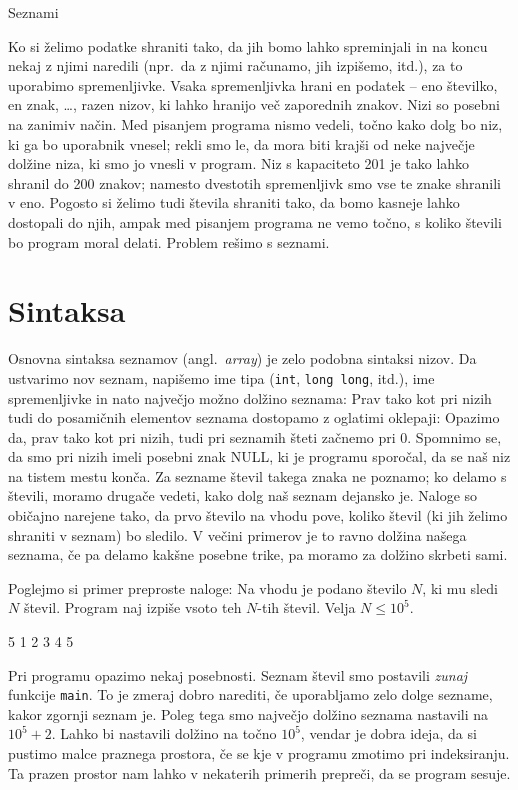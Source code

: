 
Seznami


Ko si želimo podatke shraniti tako, da jih bomo lahko spreminjali in na koncu
nekaj z njimi naredili (npr.~da z njimi računamo, jih izpišemo, itd.), za to
uporabimo spremenljivke.
Vsaka spremenljivka hrani en podatek -- eno številko, en znak, \ldots, razen
nizov, ki lahko hranijo več zaporednih znakov.
Nizi so posebni na zanimiv način.
Med pisanjem programa nismo vedeli, točno kako dolg bo niz, ki ga bo uporabnik
vnesel; rekli smo le, da mora biti krajši od neke največje dolžine niza, ki smo
jo vnesli v program.
Niz s kapaciteto 201 je tako lahko shranil do 200 znakov; namesto dvestotih
spremenljivk smo vse te znake shranili v eno.
Pogosto si želimo tudi števila shraniti tako, da bomo kasneje lahko dostopali do
njih, ampak med pisanjem programa ne vemo točno, s koliko števili bo program
moral delati.
Problem rešimo s seznami.

\section{Sintaksa}

Osnovna sintaksa seznamov (angl.~\textit{array}) je zelo podobna sintaksi nizov.
Da ustvarimo nov seznam, napišemo ime tipa (\verb+int+, \verb+long long+, itd.),
ime spremenljivke in nato največjo možno dolžino seznama:
Prav tako kot pri nizih tudi do posamičnih elementov seznama dostopamo z
oglatimi oklepaji:
Opazimo da, prav tako kot pri nizih, tudi pri seznamih šteti začnemo pri 0.
Spomnimo se, da smo pri nizih imeli posebni znak NULL, ki je programu sporočal,
da se naš niz na tistem mestu konča.
Za sezname števil takega znaka ne poznamo; ko delamo s števili, moramo drugače
vedeti, kako dolg naš seznam dejansko je.
Naloge so običajno narejene tako, da prvo število na vhodu pove, koliko števil
(ki jih želimo shraniti v seznam) bo sledilo.
V večini primerov je to ravno dolžina našega seznama, če pa delamo kakšne
posebne trike, pa moramo za dolžino skrbeti sami.

\begin{examples}
  Poglejmo si primer preproste naloge:
  Na vhodu je podano število $N$, ki mu sledi $N$ števil.
  Program naj izpiše vsoto teh $N$-tih števil.
  Velja $N \le 10^5$.
  \begin{inout}
	5
	1 2 3 4 5
  \end{inout}

  Pri programu opazimo nekaj posebnosti.
  Seznam števil smo postavili \emph{zunaj} funkcije \verb+main+.
  To je zmeraj dobro narediti, če uporabljamo zelo dolge sezname, kakor zgornji
  seznam je.
  Poleg tega smo največjo dolžino seznama nastavili na $10^5+2$.
  Lahko bi nastavili dolžino na točno $10^5$, vendar je dobra ideja, da si
  pustimo malce praznega prostora, če se kje v programu zmotimo pri indeksiranju.
  Ta prazen prostor nam lahko v nekaterih primerih prepreči, da se program sesuje.
\end{examples}

